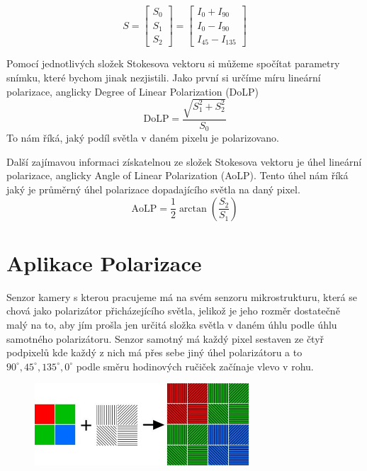 \documentclass[a4paper]{article}
\numberwithin{equation}{section}
\begin{document}
    \begin{equation}
        S = \begin{bmatrix} S_0 \\ S_1 \\ S_2 \end{bmatrix} = \begin{bmatrix} I_0 + I_{90} \\ I_0 - I_{90} \\ I_{45} - I_{135} \end{bmatrix}
    \end{equation}
    \par Pomocí jednotlivých složek Stokesova vektoru si můžeme spočítat parametry snímku, které bychom jinak nezjistili. Jako první si určíme míru lineární polarizace, anglicky Degree of Linear Polarization (DoLP)
    \begin{equation}
        \text{DoLP} = \frac{\sqrt{S_1^2 + S_2^2}}{S_0}
    \end{equation}
    To nám říká, jaký podíl světla v daném pixelu je polarizovano.
    \par Další zajímavou informaci získatelnou ze složek Stokesova vektoru je úhel lineární polarizace, anglicky Angle of Linear Polarization (AoLP). Tento úhel nám říká jaký je průměrný úhel polarizace dopadajícího světla na daný pixel. \cite{teorie_aolp_dolp}
    \begin{equation}
        \text{AoLP} = \frac{1}{2}\arctan \left(\frac{S_2}{S_1}\right)
    \end{equation}

    \newpage
	\section{Aplikace Polarizace}
	Senzor kamery s kterou pracujeme má na svém senzoru mikrostrukturu, která se chová jako polarizátor přicházejícího světla, jelikož je jeho rozměr dostatečně malý na to, aby jím prošla jen určitá složka světla v daném úhlu podle úhlu samotného polarizátoru. Senzor samotný má každý pixel sestaven ze čtyř podpixelů kde každý z nich má přes sebe jiný úhel polarizátoru a to $90^{\circ}, 45^{\circ}, 135^{\circ}, 0^{\circ}$ podle směru hodinových ručiček začínaje vlevo v rohu.
    \begin{figure}[h]
        \includegraphics[width=8cm]{figures/senzor.jpg}
        \centering
    \end{figure}
\end{document}
